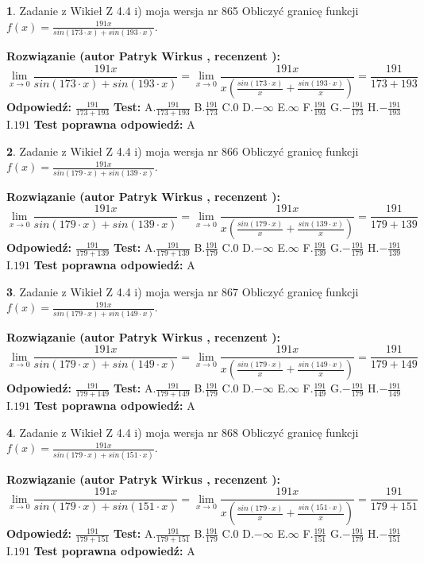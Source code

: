 \documentclass[12pt, a4paper]{article}
\theoremstyle{definition} %
\newtheorem{zad}{}
\newcommand{\zadStart}[1]{\begin{zad}#1\newline}
\newcommand{\zadStop}{\end{zad}}
\newcommand{\rozwStart}[2]{\noindent \textbf{Rozwiązanie (autor #1 , recenzent #2): }\newline}
\newcommand{\rozwStop}{\newline}
\newcommand{\odpStart}{\noindent \textbf{Odpowiedź:}\newline}
\newcommand{\odpStop}{\newline}
\newcommand{\testStart}{\noindent \textbf{Test:}\newline}
\newcommand{\testStop}{\newline}
\newcommand{\kluczStart}{\noindent \textbf{Test poprawna odpowiedź:}\newline}
\newcommand{\kluczStop}{\newline}
\begin{document}
\zadStart{Zadanie z Wikieł Z 4.4 i) moja wersja nr 865}
Obliczyć granicę funkcji $f(x)=\frac{191x}{sin(173\cdot x) +sin(193\cdot x)}$.
\zadStop
\rozwStart{Patryk Wirkus}{}
$$\lim\limits_{x\to 0}\frac{191x}{sin(173\cdot x) +sin(193\cdot x)}=\lim\limits_{x\to 0}\frac{191x}{x(\frac{sin(173\cdot x)}{x}+\frac{sin(193\cdot x)}{x})}=\frac{191}{173+193}$$
\rozwStop
\odpStart
$\frac{191}{173+193}$
\odpStop
\testStart
A.$\frac{191}{173+193}$
B.$\frac{191}{173}$
C.$0$
D.$-\infty$
E.$\infty$
F.$\frac{191}{193}$
G.$-\frac{191}{173}$
H.$-\frac{191}{193}$
I.$191$
\testStop
\kluczStart
A
\kluczStop



\zadStart{Zadanie z Wikieł Z 4.4 i) moja wersja nr 866}
Obliczyć granicę funkcji $f(x)=\frac{191x}{sin(179\cdot x) +sin(139\cdot x)}$.
\zadStop
\rozwStart{Patryk Wirkus}{}
$$\lim\limits_{x\to 0}\frac{191x}{sin(179\cdot x) +sin(139\cdot x)}=\lim\limits_{x\to 0}\frac{191x}{x(\frac{sin(179\cdot x)}{x}+\frac{sin(139\cdot x)}{x})}=\frac{191}{179+139}$$
\rozwStop
\odpStart
$\frac{191}{179+139}$
\odpStop
\testStart
A.$\frac{191}{179+139}$
B.$\frac{191}{179}$
C.$0$
D.$-\infty$
E.$\infty$
F.$\frac{191}{139}$
G.$-\frac{191}{179}$
H.$-\frac{191}{139}$
I.$191$
\testStop
\kluczStart
A
\kluczStop



\zadStart{Zadanie z Wikieł Z 4.4 i) moja wersja nr 867}
Obliczyć granicę funkcji $f(x)=\frac{191x}{sin(179\cdot x) +sin(149\cdot x)}$.
\zadStop
\rozwStart{Patryk Wirkus}{}
$$\lim\limits_{x\to 0}\frac{191x}{sin(179\cdot x) +sin(149\cdot x)}=\lim\limits_{x\to 0}\frac{191x}{x(\frac{sin(179\cdot x)}{x}+\frac{sin(149\cdot x)}{x})}=\frac{191}{179+149}$$
\rozwStop
\odpStart
$\frac{191}{179+149}$
\odpStop
\testStart
A.$\frac{191}{179+149}$
B.$\frac{191}{179}$
C.$0$
D.$-\infty$
E.$\infty$
F.$\frac{191}{149}$
G.$-\frac{191}{179}$
H.$-\frac{191}{149}$
I.$191$
\testStop
\kluczStart
A
\kluczStop



\zadStart{Zadanie z Wikieł Z 4.4 i) moja wersja nr 868}
Obliczyć granicę funkcji $f(x)=\frac{191x}{sin(179\cdot x) +sin(151\cdot x)}$.
\zadStop
\rozwStart{Patryk Wirkus}{}
$$\lim\limits_{x\to 0}\frac{191x}{sin(179\cdot x) +sin(151\cdot x)}=\lim\limits_{x\to 0}\frac{191x}{x(\frac{sin(179\cdot x)}{x}+\frac{sin(151\cdot x)}{x})}=\frac{191}{179+151}$$
\rozwStop
\odpStart
$\frac{191}{179+151}$
\odpStop
\testStart
A.$\frac{191}{179+151}$
B.$\frac{191}{179}$
C.$0$
D.$-\infty$
E.$\infty$
F.$\frac{191}{151}$
G.$-\frac{191}{179}$
H.$-\frac{191}{151}$
I.$191$
\testStop
\kluczStart
A
\kluczStop
\end{document}

